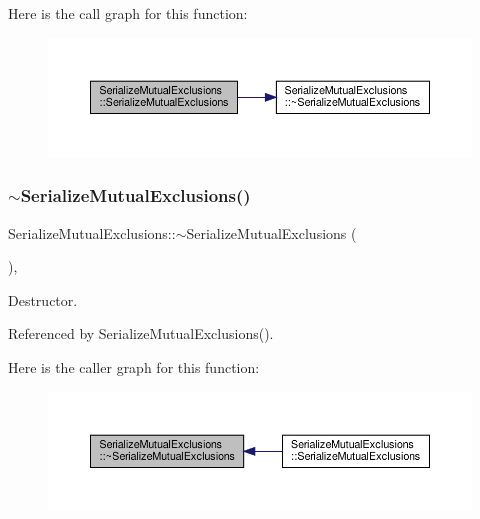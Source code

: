 Here is the call graph for this function\+:
\nopagebreak
\begin{figure}[H]
\begin{center}
\leavevmode
\includegraphics[width=350pt]{db/da1/classSerializeMutualExclusions_ae189dcb417f9d833489fa67984427eaf_cgraph}
\end{center}
\end{figure}
\mbox{\label{classSerializeMutualExclusions_a48e5dd9db164d311cd27f4f7dd8a2dd4}} 
\subsubsection{\texorpdfstring{$\sim$\+Serialize\+Mutual\+Exclusions()}{~SerializeMutualExclusions()}}
{\footnotesize\ttfamily Serialize\+Mutual\+Exclusions\+::$\sim$\+Serialize\+Mutual\+Exclusions (\begin{DoxyParamCaption}{ }\end{DoxyParamCaption})\hspace{0.3cm}{\ttfamily [override]}, {\ttfamily [default]}}



Destructor. 



Referenced by Serialize\+Mutual\+Exclusions().

Here is the caller graph for this function\+:
\nopagebreak
\begin{figure}[H]
\begin{center}
\leavevmode
\includegraphics[width=350pt]{db/da1/classSerializeMutualExclusions_a48e5dd9db164d311cd27f4f7dd8a2dd4_icgraph}
\end{center}
\end{figure}


